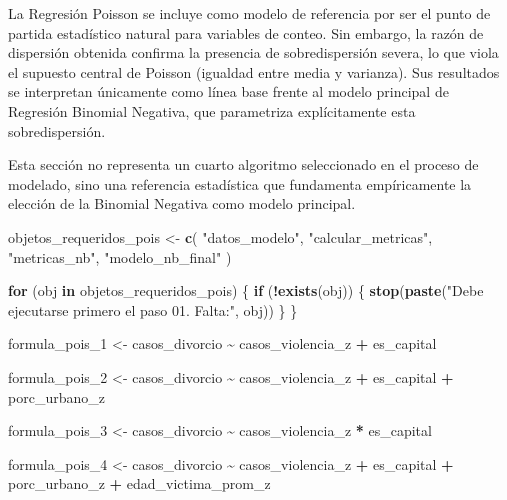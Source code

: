 \documentclass[
]{article}
\newenvironment{Shaded}{\begin{snugshade}}{\end{snugshade}}
\newcommand{\ControlFlowTok}[1]{\textcolor[rgb]{0.13,0.29,0.53}{\textbf{#1}}}
\newcommand{\FunctionTok}[1]{\textcolor[rgb]{0.13,0.29,0.53}{\textbf{#1}}}
\newcommand{\NormalTok}[1]{#1}
\newcommand{\OtherTok}[1]{\textcolor[rgb]{0.56,0.35,0.01}{#1}}
\newcommand{\SpecialCharTok}[1]{\textcolor[rgb]{0.81,0.36,0.00}{\textbf{#1}}}
\newcommand{\StringTok}[1]{\textcolor[rgb]{0.31,0.60,0.02}{#1}}
\begin{document}
La Regresión Poisson se incluye como modelo de referencia por ser el
punto de partida estadístico natural para variables de conteo. Sin
embargo, la razón de dispersión obtenida confirma la presencia de
sobredispersión severa, lo que viola el supuesto central de Poisson
(igualdad entre media y varianza). Sus resultados se interpretan
únicamente como línea base frente al modelo principal de Regresión
Binomial Negativa, que parametriza explícitamente esta sobredispersión.

Esta sección no representa un cuarto algoritmo seleccionado en el
proceso de modelado, sino una referencia estadística que fundamenta
empíricamente la elección de la Binomial Negativa como modelo principal.

\begin{Shaded}
\begin{Highlighting}[]
\NormalTok{objetos\_requeridos\_pois }\OtherTok{\textless{}{-}} \FunctionTok{c}\NormalTok{(}
  \StringTok{"datos\_modelo"}\NormalTok{, }\StringTok{"calcular\_metricas"}\NormalTok{, }\StringTok{"metricas\_nb"}\NormalTok{, }\StringTok{"modelo\_nb\_final"}
\NormalTok{)}

\ControlFlowTok{for}\NormalTok{ (obj }\ControlFlowTok{in}\NormalTok{ objetos\_requeridos\_pois) \{}
  \ControlFlowTok{if}\NormalTok{ (}\SpecialCharTok{!}\FunctionTok{exists}\NormalTok{(obj)) \{}
    \FunctionTok{stop}\NormalTok{(}\FunctionTok{paste}\NormalTok{(}\StringTok{"Debe ejecutarse primero el paso 01. Falta:"}\NormalTok{, obj))}
\NormalTok{  \}}
\NormalTok{\}}
\end{Highlighting}
\end{Shaded}

\begin{Shaded}
\begin{Highlighting}[]
\NormalTok{formula\_pois\_1 }\OtherTok{\textless{}{-}}\NormalTok{ casos\_divorcio }\SpecialCharTok{\textasciitilde{}}\NormalTok{ casos\_violencia\_z }\SpecialCharTok{+}\NormalTok{ es\_capital}

\NormalTok{formula\_pois\_2 }\OtherTok{\textless{}{-}}\NormalTok{ casos\_divorcio }\SpecialCharTok{\textasciitilde{}}\NormalTok{ casos\_violencia\_z }\SpecialCharTok{+}\NormalTok{ es\_capital }\SpecialCharTok{+}\NormalTok{ porc\_urbano\_z}

\NormalTok{formula\_pois\_3 }\OtherTok{\textless{}{-}}\NormalTok{ casos\_divorcio }\SpecialCharTok{\textasciitilde{}}\NormalTok{ casos\_violencia\_z }\SpecialCharTok{*}\NormalTok{ es\_capital}

\NormalTok{formula\_pois\_4 }\OtherTok{\textless{}{-}}\NormalTok{ casos\_divorcio }\SpecialCharTok{\textasciitilde{}}\NormalTok{ casos\_violencia\_z }\SpecialCharTok{+}\NormalTok{ es\_capital }\SpecialCharTok{+}
\NormalTok{                  porc\_urbano\_z }\SpecialCharTok{+}\NormalTok{ edad\_victima\_prom\_z}
\end{Highlighting}
\end{Shaded}
\end{document}
